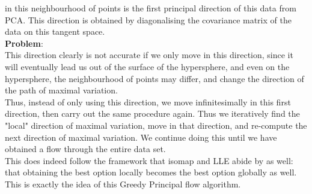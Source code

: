 \documentclass[12pt]{report}
\begin{document}
in this neighbourhood of points is the first principal direction of this data from PCA. 
This direction is obtained by diagonalising the covariance matrix of the data on this tangent
space. \\
\textbf{Problem}:\\
This direction clearly is not accurate if we only move in this direction,
since it will eventually lead us out of the surface of the hypersphere, and even on the 
hypersphere, the neighbourhood of points may differ, and change the direction 
of the path of maximal variation.\\
Thus, instead of only using this direction, we move infinitesimally in this first direction,
then carry out the same procedure again. Thus we iteratively find the "local"
direction of maximal variation, move in that direction, and re-compute the next direction
of maximal variation. We continue doing this until we have obtained a flow through the
entire data set.\\
This does indeed follow the framework that isomap and LLE abide by
as well: that obtaining the best option locally becomes the best option globally as well. 
This is exactly the idea of this Greedy Principal flow algorithm. 
\end{document}
